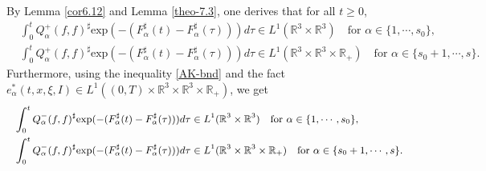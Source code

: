 \documentclass[reqno,11pt]{amsart}
\numberwithin{equation}{section}
\def\R{\mathbb{R}}
\def\exp{\mathrm{exp}}
\begin{document}
By Lemma \ref{cor6.12} and Lemma \ref{theo-7.3}, one derives that for all $t \geq 0$,
\begin{equation*}
	\begin{aligned}
		&\int_{0}^{t}Q^+_{\alpha } (f,f)^\sharp  \exp(-(F^\sharp _{\alpha } (t)-F^\sharp _{\alpha } (\tau))) d \tau \in L^1(\R^3 \times \R^3) \quad \text{for } \alpha \in \{1,\cdots,s_0\},\\
		&\int_{0}^{t}Q^+_{\alpha } (f,f)^\sharp  \exp(-(F^\sharp _{\alpha } (t)-F^\sharp _{\alpha } (\tau))) d \tau \in L^1(\R^3 \times \R^3\times \R_+) \quad \text{for } \alpha \in \{s_0+1,\cdots,s\}.
	\end{aligned}
\end{equation*}
Furthermore, using the inequality \eqref{AK-bnd} and the fact $e_\alpha^* (t, x, \xi, I) \in L^1 ( (0, T) \times \R^3 \times \R^3 \times \R_+ )$, we get
\begin{equation}\label{eq8.97}{\small
	\begin{aligned}
		&\int_{0}^{t}Q^-_{\alpha } (f,f)^\sharp  \exp(-(F^\sharp _{\alpha } (t)-F^\sharp _{\alpha } (\tau ) ) ) d \tau \in L^1(\R^3 \times \R^3) \quad \text{for } \alpha \in \{1,\cdots,s_0\},\\
		&\int_{0}^{t}Q^-_{\alpha } (f,f)^\sharp  \exp(-(F^\sharp _{\alpha } (t)-F^\sharp _{\alpha } (\tau))) d \tau \in L^1(\R^3 \times \R^3\times \R_+) \quad \text{for } \alpha \in \{s_0+1,\cdots,s\}.
	\end{aligned}}
\end{equation}
\end{document}

